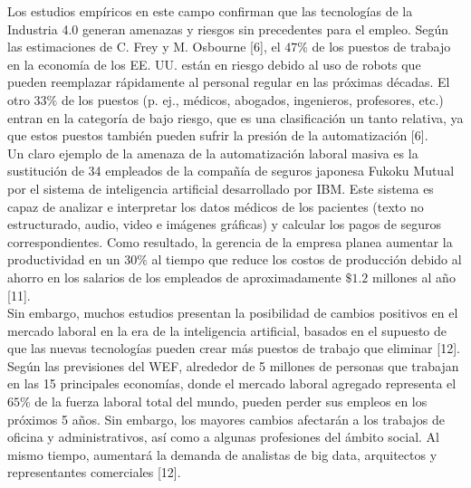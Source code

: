 Los estudios empíricos en este campo confirman que las tecnologías de la Industria 4.0 generan amenazas y riesgos sin precedentes para el empleo. Según las estimaciones de C. Frey y M. Osbourne [6], el $47\%$ de los puestos de trabajo en la economía de los EE. UU. están en riesgo debido al uso de robots que pueden reemplazar rápidamente al personal regular en las próximas décadas. El otro $33\%$ de los puestos (p. ej., médicos, abogados, ingenieros, profesores, etc.) entran en la categoría de bajo riesgo, que es una clasificación un tanto relativa, ya que estos puestos también pueden sufrir la presión de la automatización [6].\\

Un claro ejemplo de la amenaza de la automatización laboral masiva es la sustitución de 34 empleados de la compañía de seguros japonesa Fukoku Mutual por el sistema de inteligencia artificial desarrollado por IBM. Este sistema es capaz de analizar e interpretar los datos médicos de los pacientes (texto no estructurado, audio, video e imágenes gráficas) y calcular los pagos de seguros correspondientes. Como resultado, la gerencia de la empresa planea aumentar la productividad en un $30\%$ al tiempo que reduce los costos de producción debido al ahorro en los salarios de los empleados de aproximadamente $\$ 1.2$ millones al año [11].\\

Sin embargo, muchos estudios presentan la posibilidad de cambios positivos en el mercado laboral en la era de la inteligencia artificial, basados en el supuesto de que las nuevas tecnologías pueden crear más puestos de trabajo que eliminar [12]. Según las previsiones del WEF, alrededor de 5 millones de personas que trabajan en las 15 principales economías, donde el mercado laboral agregado representa el $65\%$ de la fuerza laboral total del mundo, pueden perder sus empleos en los próximos 5 años. Sin embargo, los mayores cambios afectarán a los trabajos de oficina y administrativos, así como a algunas profesiones del ámbito social. Al mismo tiempo, aumentará la demanda de analistas de big data, arquitectos y representantes comerciales [12].\\

